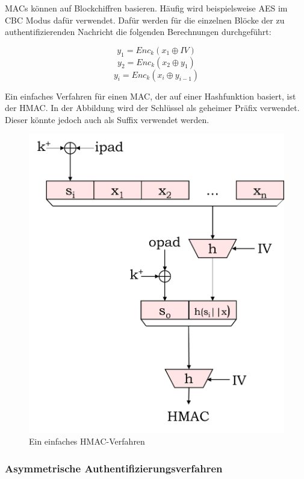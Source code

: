			MACs können auf Blockchiffren basieren. Häufig wird beispielsweise AES im \ac{CBC} Modus dafür verwendet. Dafür werden für die einzelnen Blöcke der zu authentifizierenden Nachricht die folgenden Berechnungen durchgeführt:
			
			\[ y_{1} = Enc_{k}(x_{1} \oplus IV) \]
			\[ y_{2} = Enc_{k}(x_{2} \oplus y_{1}) \]
			\[ y_{i} = Enc_{k}(x_{i} \oplus y_{i-1}) \]
			
			Ein einfaches Verfahren für einen MAC, der auf einer Hashfunktion basiert, ist der HMAC. In der Abbildung wird der Schlüssel als geheimer Präfix verwendet. Dieser könnte jedoch auch als Suffix verwendet werden. \cite{Paar2010-D}\\ 
			
			\begin{figure}[htbp]
				\centering
				\includegraphics[width=\textwidth]{chapters/abb/grundlagen-hmac}
				\caption{Ein einfaches HMAC-Verfahren}
				\label{fig:grundlagen:hmac}
			\end{figure}
			
			\subsubsection{Asymmetrische Authentifizierungsverfahren}
			\label{subsubsec:grundlagen:krypto:auth:asym}
			
